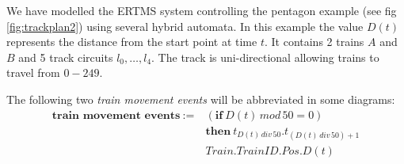 \begin{comment}



\def\r{3} 
\def\sone{ \sin 32}
\def\stwo{\sin 72}
\def\cone{\cos 32}
\def\ctwo{\cos 72}
\coordinate(top) at (0,\r);
\coordinate(topleft) at ({ \r * -cos (36)},{ \r * -sin (36)});
\coordinate(topright) at ({ \r * cos (72)}, { \r * -sin (72)});
\coordinate(botleft) at ({ \r * - cos (36)},{ \r * sin (36)});
\coordinate(botright) at ({\r * sin (72)},{\r * cos (72)});

\tikzstyle{box1}=[circle, draw, text width = 2cm, font=\scriptsize]
\tikzstyle{box3}=[rectangle, draw, text width = 2cm, font=\scriptsize]
\tikzstyle{arrow}=[->, thick]
\tikzstyle{biarrow}=[<->,very thick,shorten >=7pt,shorten <=7pt]


\node (A) [font = \scriptsize]  at (topleft)                  {D =150 };

\node (B) [font = \scriptsize]    at (botleft)          {D = 0};

\node (C)[font = \scriptsize] at (top)  { D = 100
						};

\node (D)[font = \scriptsize] at (botright)  { D = 50
						};

\node (E) [font = \scriptsize] at (topright) {D = 200};

\draw [arrow] (D) -- node[right] {$t_1$} (E);
\draw [arrow] (A) -- node[below = 10pt] {$t_4$} (B);
\draw [arrow] (B) --  node[above = 10pt] {$t_2$} (C);
\draw [arrow] (C) -- node [left] {$t_3$} (D);
\end{comment}
We have modelled the ERTMS system controlling the pentagon example (see fig \ref{fig:trackplan2}) using several hybrid automata. In this example the value $D(t)$ represents the distance from the start point at time $t$. 
It contains 2 trains $A$ and $B$ and 5 track circuits $l_0, \ldots , l_4$. The track is uni-directional allowing trains to travel from $0 - 249$. 
\medskip
\begin{myremark}
The following two \emph{train movement events} will be abbreviated in some diagrams:
\begin{align*}
\textbf{train movement events}  \ :=  \ &( \textbf{if} \ D(t) \, mod \, 50 = 0)  \\
  &\textbf{then} \  t_{D(t) \, div \, 50}.t_{(D(t) \, div \, 50) +1} \\
&Train.TrainID.Pos.D(t)
\end{align*} 

\end{myremark}

